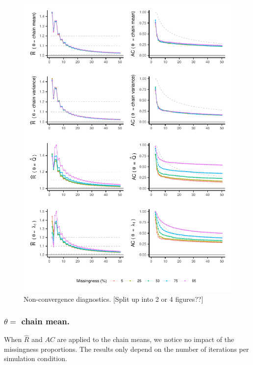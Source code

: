\documentclass[Royal,times,sageh]{sagej}
\begin{document}
\begin{figure}

{\centering \includegraphics{2.Manuscript_files/figure-latex/rhats-acs-1} 

}

\caption{Non-convergence diagnostics. [Split up into 2 or 4 figures??]}\label{fig:rhats-acs}
\end{figure}

\hypertarget{theta-chain-mean.}{%
\subsubsection{\texorpdfstring{\(\theta=\) chain mean.}{\textbackslash theta= chain mean.}}\label{theta-chain-mean.}}

When \(\widehat{R}\) and \(AC\) are applied to the chain means, we notice no impact of the missingness proportions. The results only depend on the number of iterations per simulation condition.
\end{document}
